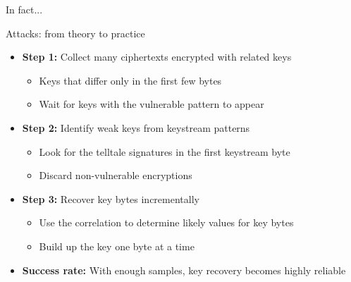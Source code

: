 \documentclass[aspectratio=169, lualatex, handout]{beamer}
\begin{document}
\begin{frame}{In fact...}
\end{frame}

\begin{frame}{Attacks: from theory to practice}
	\begin{itemize}[<+->]
		\item \textbf{Step 1:} Collect many ciphertexts encrypted with related keys
		      \begin{itemize}[<+->]
			      \item Keys that differ only in the first few bytes
			      \item Wait for keys with the vulnerable pattern to appear
		      \end{itemize}
		\item \textbf{Step 2:} Identify weak keys from keystream patterns
		      \begin{itemize}[<+->]
			      \item Look for the telltale signatures in the first keystream byte
			      \item Discard non-vulnerable encryptions
		      \end{itemize}
		\item \textbf{Step 3:} Recover key bytes incrementally
		      \begin{itemize}[<+->]
			      \item Use the correlation to determine likely values for key bytes
			      \item Build up the key one byte at a time
		      \end{itemize}
		\item \textbf{Success rate:} With enough samples, key recovery becomes highly reliable
	\end{itemize}
\end{frame}
\end{document}
